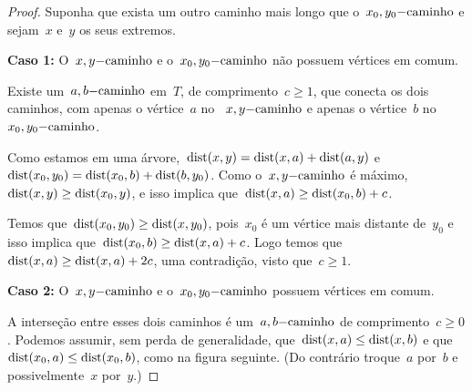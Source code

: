 	\begin{proof}
		Suponha que exista um outro caminho mais longo que 
		o~$x_0,y_0\mathrm{-caminho}$ e sejam~$x$ e~$y$ os seus extremos.

	        \textbf{Caso 1:} O~$x,y\mathrm{-caminho}$ e 
	        o~$x_0,y_0\mathrm{-caminho}$ não possuem vértices em comum.

	        Existe um~$a,b\mathrm{-caminho}$ em~$T$, de 
	        comprimento~${c \ge 1}$, que conecta os dois caminhos, 
	        com apenas o vértice~$a$ 
	        no ~$x,y\mathrm{-caminho}$ e apenas o vértice~$b$ 
	        no~$x_0,y_0\mathrm{-caminho}$.

	        \begin{center}  \end{center}


	        Como estamos em uma 
	        árvore,~${\mathrm{dist}(x,y) =\mathrm{dist}(x,a)+\mathrm{dist}(a,y)}$
	        e~${\mathrm{dist}(x_0,y_0) =\mathrm{dist}(x_0,b)+\mathrm{dist}(b,y_0)}$.
	        Como o~$x,y\mathrm{-caminho}$ é 
	        máximo,~${\mathrm{dist}(x,y)\ge \mathrm{dist}(x_0,y)}$,
	        e isso implica que~${\mathrm{dist}(x,a)\ge \mathrm{dist}(x_0,b)+c}$.
 			
 			Temos que~${\mathrm{dist}(x_0,y_0)\ge \mathrm{dist}(x,y_0)}$,
	        pois~$x_0$ é um vértice mais distante de~$y_0$ e isso implica 
	        que~${\mathrm{dist}(x_0,b)\ge \mathrm{dist}(x,a)+c}$.
	        Logo temos 
	        que~${\mathrm{dist}(x,a)\ge \mathrm{dist}(x, a)+2c}$,
	        uma contradição, visto que~${c\ge 1}$.


			\bigskip
			\bigskip
			\bigskip


			\textbf{Caso 2:} O~$x,y\mathrm{-caminho}$ e 
			o~$x_0,y_0\mathrm{-caminho}$ possuem vértices em comum.

			A interseção entre esses dois caminhos é 
			um~$a,b\mathrm{-caminho}$ de comprimento~${c \ge 0}$.
			Podemos assumir, sem perda de generalidade, 
			que~${\mathrm{dist}(x,a) \le \mathrm{dist}(x,b)}$ e 
			que~${\mathrm{dist}(x_0,a) \le \mathrm{dist}(x_0,b)}$, como na figura 
			seguinte.
			(Do contrário troque~$a$ por~$b$ e possivelmente~$x$
			por~$y$.)


\end{proof}
